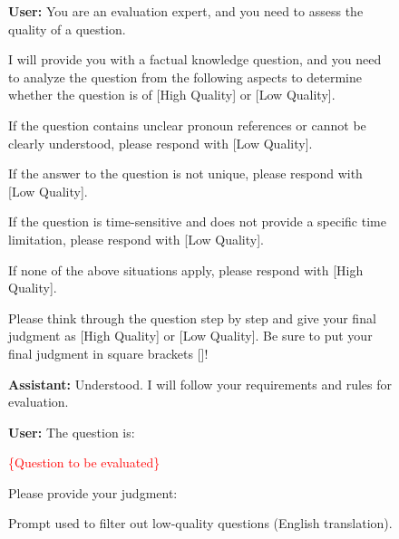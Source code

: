 \begin{figure*}[ht]
\centering
\begin{tcolorbox}[title=Question filtering, width=\textwidth]
\textbf{User: }You are an evaluation expert, and you need to assess the quality of a question.

I will provide you with a factual knowledge question, and you need to analyze the question from the following aspects to determine whether the question is of [High Quality] or [Low Quality].

If the question contains unclear pronoun references or cannot be clearly understood, please respond with [Low Quality].

If the answer to the question is not unique, please respond with [Low Quality].

If the question is time-sensitive and does not provide a specific time limitation, please respond with [Low Quality].

If none of the above situations apply, please respond with [High Quality].

Please think through the question step by step and give your final judgment as [High Quality] or [Low Quality]. Be sure to put your final judgment in square brackets []!

\vspace{1em}

\textbf{Assistant: }Understood. I will follow your requirements and rules for evaluation.

\vspace{1em}

\textbf{User: }The question is:

\textcolor{red}{\{Question to be evaluated\}}

Please provide your judgment:

\vspace{1em}
\end{tcolorbox}
\caption {Prompt used to filter out low-quality questions (English translation).}
\label{fig:filter prompt english}
\end{figure*}

